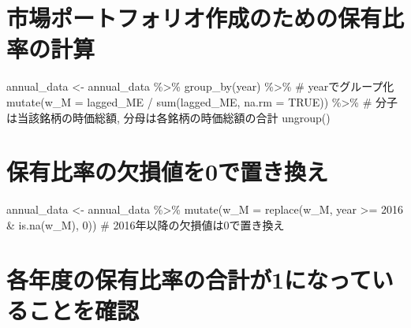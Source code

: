 \documentclass[
  letterpaper,
  DIV=11,
  numbers=noendperiod]{scrreprt}
\newenvironment{Shaded}{\begin{snugshade}}{\end{snugshade}}
\newcommand{\AttributeTok}[1]{\textcolor[rgb]{0.40,0.45,0.13}{#1}}
\newcommand{\CommentTok}[1]{\textcolor[rgb]{0.37,0.37,0.37}{#1}}
\newcommand{\ConstantTok}[1]{\textcolor[rgb]{0.56,0.35,0.01}{#1}}
\newcommand{\DecValTok}[1]{\textcolor[rgb]{0.68,0.00,0.00}{#1}}
\newcommand{\FunctionTok}[1]{\textcolor[rgb]{0.28,0.35,0.67}{#1}}
\newcommand{\NormalTok}[1]{\textcolor[rgb]{0.00,0.23,0.31}{#1}}
\newcommand{\OtherTok}[1]{\textcolor[rgb]{0.00,0.23,0.31}{#1}}
\newcommand{\SpecialCharTok}[1]{\textcolor[rgb]{0.37,0.37,0.37}{#1}}
\begin{document}
\section{市場ポートフォリオ作成のための保有比率の計算}\label{ux5e02ux5834ux30ddux30fcux30c8ux30d5ux30a9ux30eaux30aaux4f5cux6210ux306eux305fux3081ux306eux4fddux6709ux6bd4ux7387ux306eux8a08ux7b97}

\begin{Shaded}
\begin{Highlighting}[]
\NormalTok{annual\_data }\OtherTok{\textless{}{-}}\NormalTok{ annual\_data }\SpecialCharTok{\%\textgreater{}\%}
  \FunctionTok{group\_by}\NormalTok{(year) }\SpecialCharTok{\%\textgreater{}\%} \CommentTok{\# yearでグループ化}
  \FunctionTok{mutate}\NormalTok{(}\AttributeTok{w\_M =}\NormalTok{ lagged\_ME }\SpecialCharTok{/} \FunctionTok{sum}\NormalTok{(lagged\_ME, }\AttributeTok{na.rm =} \ConstantTok{TRUE}\NormalTok{)) }\SpecialCharTok{\%\textgreater{}\%} \CommentTok{\# 分子は当該銘柄の時価総額, 分母は各銘柄の時価総額の合計}
  \FunctionTok{ungroup}\NormalTok{()}
\end{Highlighting}
\end{Shaded}

\section{保有比率の欠損値を0で置き換え}\label{ux4fddux6709ux6bd4ux7387ux306eux6b20ux640dux5024ux30920ux3067ux7f6eux304dux63dbux3048}

\begin{Shaded}
\begin{Highlighting}[]
\NormalTok{annual\_data }\OtherTok{\textless{}{-}}\NormalTok{ annual\_data }\SpecialCharTok{\%\textgreater{}\%} 
  \FunctionTok{mutate}\NormalTok{(}\AttributeTok{w\_M =} \FunctionTok{replace}\NormalTok{(w\_M, year }\SpecialCharTok{\textgreater{}=} \DecValTok{2016} \SpecialCharTok{\&} \FunctionTok{is.na}\NormalTok{(w\_M), }\DecValTok{0}\NormalTok{)) }\CommentTok{\# 2016年以降の欠損値は0で置き換え}
\end{Highlighting}
\end{Shaded}

\section{各年度の保有比率の合計が1になっていることを確認}\label{ux5404ux5e74ux5ea6ux306eux4fddux6709ux6bd4ux7387ux306eux5408ux8a08ux304c1ux306bux306aux3063ux3066ux3044ux308bux3053ux3068ux3092ux78baux8a8d}
\end{document}
